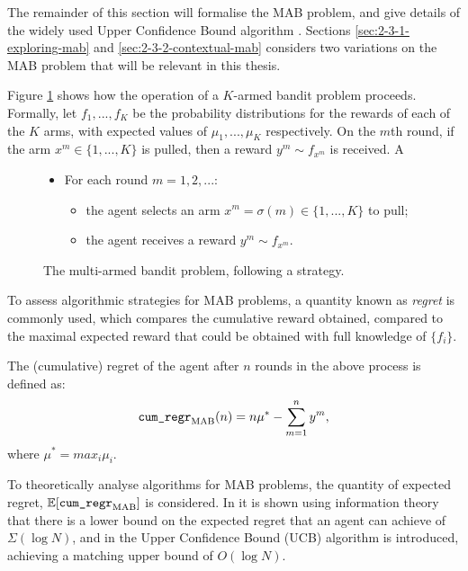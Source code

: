     The remainder of this section will formalise the MAB problem, and give details of the widely used Upper Confidence Bound algorithm . Sections \ref{sec:2-3-1-exploring-mab} and \ref{sec:2-3-2-contextual-mab} considers two variations on the MAB problem that will be relevant in this thesis.

    Figure \ref{fig:mab_prob} shows how the operation of a $K$-armed bandit problem proceeds. Formally, let $f_1,...,f_K$ be the probability distributions for the rewards of each of the $K$ arms, with expected values of $\mu_1,...,\mu_K$ respectively. On the $m$th round, if the arm $x^m\in\{1,...,K\}$ is pulled, then a reward $y^m\sim f_{x^m}$ is received. A \textit{}

    \begin{figure}
        \begin{tcolorbox}
            \begin{itemize}
                \item For each round $m=1,2,...$:
                \begin{itemize}
                    \item the agent selects an arm $x^m=\sigma(m)\in\{1,...,K\}$ to pull;
                    \item the agent receives a reward $y^m \sim f_{x^m}$.
                \end{itemize} 
            \end{itemize}
        \end{tcolorbox}
        \caption{The multi-armed bandit problem, following a strategy.}
        \label{fig:mab_prob}
    \end{figure}
    
    To assess algorithmic strategies for MAB problems, a quantity known as \textit{regret} is commonly used, which compares the cumulative reward obtained, compared to the maximal expected reward that could be obtained with full knowledge of $\{f_i\}$.

    \begin{defn}
        The \textnormal{(cumulative) regret} of the agent after $n$ rounds in the above process is defined as:
        \begin{align}
            {\textnormal{\texttt{cum\_regr}}}_{{\textnormal{MAB}}}(n) = n\mu^* - \sum_{m=1}^n y^m,
        \end{align}
        where $\mu^* = max_i \mu_i$.
    \end{defn}

    To theoretically analyse algorithms for MAB problems, the quantity of expected regret, $\mathbb{E}[{\textnormal{\texttt{cum\_regr}}}_{{\textnormal{MAB}}}]$ is considered. In  it is shown using information theory that there is a lower bound on the expected regret that an agent can achieve of $\Sigma(\log N)$, and in  the Upper Confidence Bound (UCB) algorithm is introduced, achieving a matching upper bound of $O(\log N)$. 

